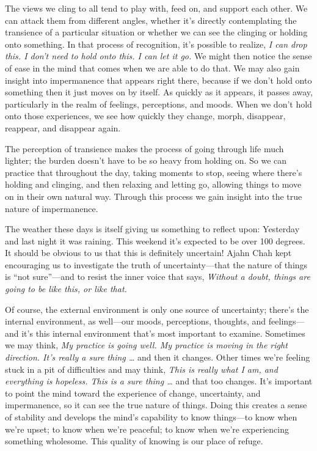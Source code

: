 The views we cling to all tend to play with, feed on, and support each 
other. We can attack them from different angles, whether it's directly 
contemplating the transience of a particular situation or whether we 
can see the clinging or holding onto something. In that process of 
recognition, it's possible to realize, \emph{I can drop this. I don't 
need to hold onto this. I can let it go.} We might then notice the 
sense of ease in the mind that comes when we are able to do that. We 
may also gain insight into impermanence that appears right there, 
because if we don't hold onto something then it just moves on by 
itself. As quickly as it appears, it passes away, particularly in the 
realm of feelings, perceptions, and moods. When we don't hold onto 
those experiences, we see how quickly they change, morph, disappear, 
reappear, and disappear again.

The perception of transience makes the process of going through life 
much lighter; the burden doesn't have to be so heavy from holding on. 
So we can practice that throughout the day, taking moments to stop, 
seeing where there's holding and clinging, and then relaxing and 
letting go, allowing things to move on in their own natural way. 
Through this process we gain insight into the true nature of 
impermanence.


The weather these days is itself giving us something to reflect upon: 
Yesterday and last night it was raining. This weekend it's expected to 
be over 100 degrees. It should be obvious to us that this is definitely 
uncertain! Ajahn Chah kept encouraging us to investigate the truth of 
uncertainty---that the nature of things is ``not sure''---and to resist 
the inner voice that says, \emph{Without a doubt, things are going to 
be like this, or like that.}

Of course, the external environment is only one source of uncertainty; 
there's the internal environment, as well---our moods, perceptions, 
thoughts, and feelings---and it's this internal environment that's most 
important to examine. Sometimes we may think, \emph{My practice is 
going well. My practice is moving in the right direction. It's really a 
sure thing \ldots{}} and then it changes. Other times we're feeling 
stuck in a pit of difficulties and may think, \emph{This is really what 
I am, and everything is hopeless. This is a sure thing \ldots{}} and 
that too changes. It's important to point the mind toward the 
experience of change, uncertainty, and impermanence, so it can see the 
true nature of things. Doing this creates a sense of stability and 
develops the mind's capability to know things---to know when we're 
upset; to know when we're peaceful; to know when we're experiencing 
something wholesome. This quality of knowing is our place of refuge.

